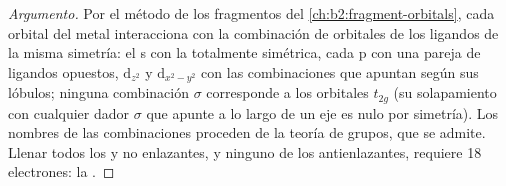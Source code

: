 \begin{proof}[Argumento]
Por el método de los fragmentos del \cref{ch:b2:fragment-orbitals}, cada orbital del metal interacciona
con la combinación de orbitales de los ligandos de la misma simetría: el s con la totalmente
simétrica, cada p con una pareja de ligandos opuestos, $\mathrm d_{z^2}$ y $\mathrm
d_{x^2-y^2}$ con las combinaciones que apuntan según sus lóbulos; ninguna combinación $\sigma$
corresponde a los orbitales $t_{2g}$ (su solapamiento con cualquier dador $\sigma$ que apunte a lo largo de un eje
es nulo por simetría). Los nombres de las combinaciones proceden de la teoría de grupos, que se admite.
Llenar todos los  y no enlazantes, y ninguno de los antienlazantes, requiere
18 electrones: la .
\end{proof}

